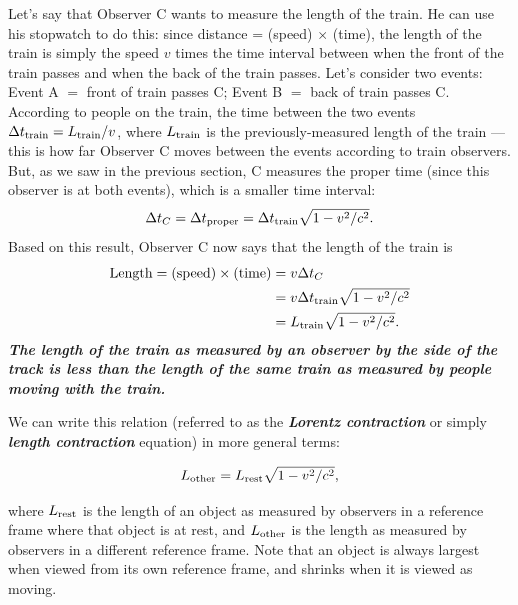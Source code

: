 Let's say that Observer C wants to measure the length of the train.
He can use his stopwatch to do this: since distance = (speed) $\times$
(time), the length of the train is simply the speed $v$ times the time
interval between when the front of the train passes and when the back
of the train passes.  Let's consider two events: Event A $=$ front of
train passes C; Event B $=$ back of train passes C.  According to
people on the train, the time between the two events $\Delta t_{\rm
  train} = L_{\rm train}/v$, where $L_{\rm train}$ is the
previously-measured length of the train --- this is how far Observer C
moves between the events according to train observers.  But, as we saw
in the previous section, C measures the proper time (since this
observer is at both events), which is a smaller time interval:
\begin{equation}
\Delta t_C = \Delta t_{\rm proper} = \Delta t_{\rm train}\sqrt{1 - v^2/c^2}.
\end{equation}
Based on this result, Observer C now says that the length of the train is 
\begin{align}
 \text{Length} = (\text{speed})\times (\text{time}) &= v\Delta t_C \nonumber \\
                &=  v \Delta t_{\rm train}\sqrt{1-v^2/c^2}  \nonumber \\
                &= L_{\rm train}\sqrt{1-v^2/c^2}.
\end{align}
{\bf {\em The length of the train as measured by an observer by the
side of the track is less than the length of the same train as
measured by people moving with the train.}}

We can write this relation (referred to as the {\bf {\em Lorentz
contraction}} or simply {\bf {\em length contraction}} equation) in
more general terms:

\begin{boxiteq}
{
\begin{equation}    
L_{\rm other} = L_{\rm rest}\sqrt{1-v^2/c^2},
\label{eq:lengthcontract}	
\end{equation}
}
\end{boxiteq}

\noindent where $L_{\rm rest}$ is the length of an object as measured by
observers in a reference frame where that object is at rest, and
$L_{\rm other}$ is the length as measured by observers in a different
reference frame.  Note that an object is always largest when viewed
from its own reference frame, and shrinks when it is viewed as moving.
   
